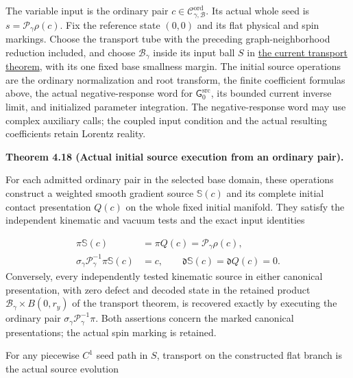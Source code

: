 \documentclass[
  english,
  11pt,
  reqno]{amsart}
\makeatletter
\newcommand{\pandocstatementheading}[1]{%
  \par\addpenalty{\@beginparpenalty}%
  \addvspace{.5\baselineskip plus .2\baselineskip minus .2\baselineskip}%
  {\normalfont\bfseries #1\par}%
  \nobreak\@afterindenttrue\@afterheading
}
\makeatother
\begin{document}
The variable input is the ordinary pair
\(c\in\mathscr C^{\mathrm{ord}}_{\gamma,\mathcal B}\). Its actual whole
seed is \(s=\mathscr P_\gamma\rho(c)\). Fix the reference state
\((0,0)\) and its flat physical and spin markings. Choose the transport
tube with the preceding graph-neighborhood reduction included, and
choose \(\mathcal B_\gamma\) inside its input ball \(S\) in
\hyperref[thm:online-current-input-transport]{the current transport
theorem}, with its one fixed base smallness margin. The initial source
operations are the ordinary normalization and root transform, the finite
coefficient formulas above, the actual negative-response word for
\(\mathsf G_0^{\mathrm{src}}\), its bounded current inverse limit, and
initialized parameter integration. The negative-response word may use
complex auxiliary calls; the coupled input condition and the actual
resulting coefficients retain Lorentz reality.

\pandocstatementheading{\leavevmode{}\label{thm:online-ordinary-negative-response-initial-source}Theorem 4.18 (Actual initial source execution from an ordinary pair).}

For each admitted ordinary pair in the selected base domain, these
operations construct a weighted smooth gradient source \(\mathbb S(c)\)
and its complete initial contact presentation \(Q(c)\) on the whole
fixed initial manifold. They satisfy the independent kinematic and
vacuum tests and the exact input identities

\label{eq:online-ordinary-source-exact-unit-admission} \[
\begin{aligned}
\pi\mathbb S(c)&=\pi Q(c)=\mathscr P_\gamma\rho(c),\\
\sigma_\gamma\mathscr P_\gamma^{-1}\pi\mathbb S(c)&=c,
\qquad\mathfrak d\mathbb S(c)=\mathfrak d Q(c)=0.
\end{aligned}
\] Conversely, every independently tested kinematic source in either
canonical presentation, with zero defect and decoded state in the
retained product \(\mathcal B_\gamma\times B(0,r_y)\) of the transport
theorem, is recovered exactly by executing the ordinary pair
\(\sigma_\gamma\mathscr P_\gamma^{-1}\pi\). Both assertions concern the
marked canonical presentations; the actual spin marking is retained.

For any piecewise \(C^1\) seed path in \(S\), transport on the
constructed flat branch is the actual source evolution
\end{document}

